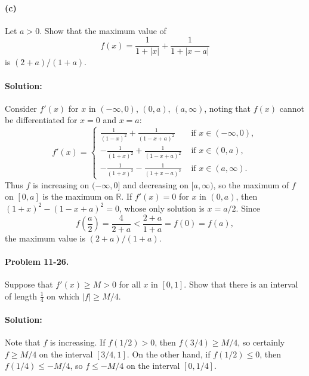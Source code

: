 \documentclass{article}
\begin{document}
\paragraph{(c)} Let $a > 0$. Show that the maximum value of \begin{equation*}
  f(x) = \frac{1}{1 + |x|} + \frac{1}{1 + |x - a|}
\end{equation*} is $(2 + a)/(1 + a)$.

\paragraph{Solution:} Consider $f'(x)$ for $x$ in $(-\infty, 0)$, $(0, a)$,
$(a, \infty)$, noting that $f(x)$ cannot be differentiated for $x = 0$ and $x =
a$:
\begin{equation*}
  f'(x) = \begin{cases}
    \frac{1}{(1 - x)^2} + \frac{1}{(1 - x + a)^2} &\text{ if } x \in (-\infty,
      0), \\
    -\frac{1}{(1 + x)^2} + \frac{1}{(1 - x + a)^2} &\text{ if } x \in (0, a),
      \\
    -\frac{1}{(1 + x)^2} - \frac{1}{(1 + x - a)^2} &\text{ if } x \in (a,
      \infty).
  \end{cases}
\end{equation*} Thus $f$ is increasing on $(-\infty, 0]$ and decreasing on $[a,
\infty)$, so the maximum of $f$ on $[0, a]$ is the maximum on $\mathbb{R}$. If
$f'(x) = 0$ for $x$ in $(0, a)$, then $(1 + x)^2 - (1 - x + a)^2 = 0$, whose
only solution is $x = a/2$. Since \begin{equation*}
  f\left(\frac{a}{2}\right) = \frac{4}{2 + a} < \frac{2 + a}{1 + a} = f(0) =
    f(a),
\end{equation*} the maximum value is $(2 + a)/(1 + a)$.

\paragraph{Problem 11-26.} Suppose that $f'(x) \geq M > 0$ for all $x$ in $[0,
1]$. Show that there is an interval of length $\frac{1}{4}$ on which $|f| \geq
M/4$.

\paragraph{Solution:} Note that $f$ is increasing. If $f(1/2) > 0$, then
$f(3/4) \geq M/4$, so certainly $f \geq M/4$ on the interval $[3/4, 1]$. On the
other hand, if $f(1/2) \leq 0$, then $f(1/4) \leq -M/4$, so $f \leq -M/4$ on
the interval $[0, 1/4]$.
\end{document}

